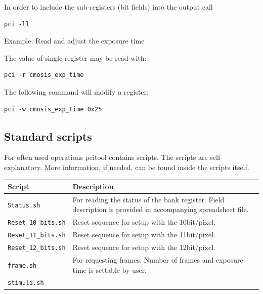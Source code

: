 In order to include the sub-registers (bit fields) into the output call
\begin{verbatim}
pci -ll
\end{verbatim}

Example: Read and adjust the exposure time

The value of single register may be read with:
\begin{verbatim}
pci -r cmosis_exp_time
\end{verbatim}

The following command will modify a register:
\begin{verbatim}
pci -w cmosis_exp_time 0x25
\end{verbatim}



\subsection{Standard scripts}

For often used operations pcitool contains scripts.
The scripts are self-explanatory. More information, if needed, can be found inside the scripts itself.

\begin{tabular}{|l|p{10cm}|}
\hline
Script						& Description \\
\hline
\verb/Status.sh/			& For reading the status of the bank register. Field description is provided in accompanying spreadsheet file. \\
\hline
\verb/Reset_10_bits.sh/ 	& Reset sequence for setup with the 10bit/pixel. \\
\hline

\verb/Reset_11_bits.sh/ 	& Reset sequence for setup with the 11bit/pixel. \\
\hline
\verb/Reset_12_bits.sh/ 	& Reset sequence for setup with the 12bit/pixel. \\
\hline
\verb/frame.sh/ 			& For requesting frames. Number of frames and exposure time is settable by user. \\
\hline
\verb/stimuli.sh/			& \\
\hline
\end{tabular}






